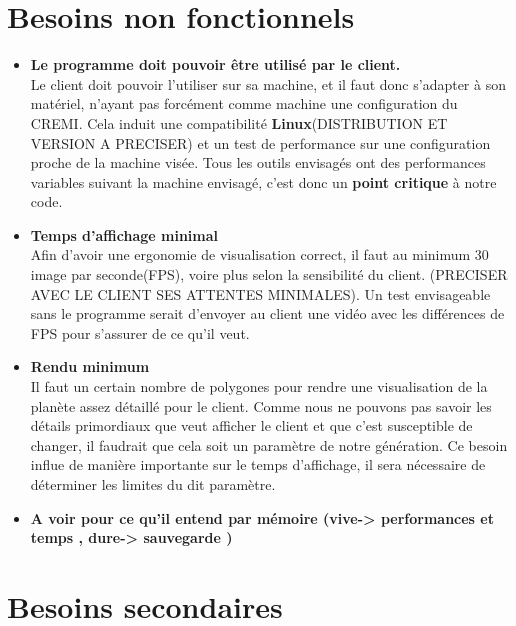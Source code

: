 \documentclass[a4paper]{article}
\begin{document}
\newpage
\section{Besoins non fonctionnels}

    \begin{itemize}
    
    \item \textbf{Le programme doit pouvoir être utilisé par le client.} \\
    Le client doit pouvoir l'utiliser sur sa machine, et il faut donc s'adapter à son matériel, n'ayant pas forcément comme machine une configuration du CREMI.
    Cela induit une compatibilité \textbf{Linux}(DISTRIBUTION ET VERSION A PRECISER) et un test de performance sur une configuration proche de la machine visée. Tous les outils envisagés ont des performances variables suivant la machine envisagé, c'est donc un \textbf{point critique} à notre code.
    
    \item \textbf{Temps d'affichage minimal} \\
    Afin d'avoir une ergonomie de visualisation correct, il faut au minimum 30 image par seconde(FPS), voire plus selon la sensibilité du client. (PRECISER AVEC LE CLIENT SES ATTENTES MINIMALES).
    Un test envisageable sans le programme serait d'envoyer au client une vidéo avec les différences de FPS pour s'assurer de ce qu'il veut.
    
    \item \textbf{Rendu minimum} \\
    Il faut un certain nombre de polygones pour rendre une visualisation de la planète assez détaillé pour le client. Comme nous ne pouvons pas savoir les détails primordiaux que veut afficher le client et que c'est susceptible de changer, il faudrait que cela soit un paramètre de notre génération. Ce besoin influe de manière importante sur le temps d'affichage, il sera nécessaire de déterminer les limites du dit paramètre.
    
    \item \textbf{A voir pour ce qu'il entend par mémoire (vive-> performances et temps , dure-> sauvegarde )}
    \end{itemize}

\newpage
\section{Besoins secondaires}
\end{document}
